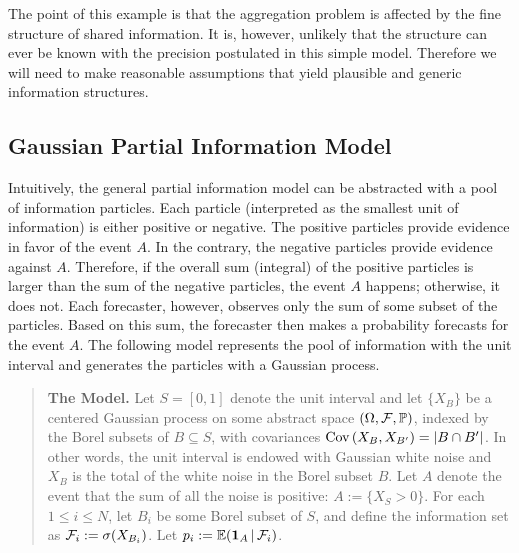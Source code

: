 \documentclass[11pt]{article}
\renewcommand{\P}{\mathbb{P}}
\newcommand{\E}{\mathbb{E}}
\theoremstyle{definition}
\theoremstyle{definition}
\def\one{{\bf 1}}
\def\F{{\cal F}}
\def\P{{\mathbb P}}
\def\E{{\mathbb E}}
\def\Cov{{\rm Cov}\,}
\def\|{\, | \,}
\begin{document}
The point of this example is that the aggregation problem is affected
by the fine structure of shared information.  It is, however, unlikely
that the structure can ever be known with the precision postulated in
this simple model.  Therefore we will need to make reasonable
assumptions that yield plausible and generic information structures.

\subsection{Gaussian Partial Information Model}
\label{ss:Gaussian}
Intuitively, the general partial information model can be abstracted with a pool of information particles. Each particle (interpreted as the smallest unit of information) is either positive or negative. The positive particles provide evidence in favor of the event $A$. 
In the contrary, the negative particles provide evidence against $A$. Therefore, if the overall sum (integral) of the positive particles is larger than the sum of the negative particles, the event $A$ happens; otherwise, it does not. Each forecaster, however, observes only the sum of some subset of the particles. Based on this sum, the forecaster then makes a probability forecasts for the event $A$. The following model represents the pool of information with the unit interval and generates the particles with a Gaussian process. 

\begin{quote}
{\bf The Model.} Let $S = [0,1]$ denote the unit interval and let $\{
X_B \}$ be a centered Gaussian process on some abstract space $(\Omega
, \F , \P)$, indexed by the Borel subsets of $B \subseteq S$, with
covariances $\Cov (X_B , X_{B'}) = |B \cap B'|$.  In other words, the
unit interval is endowed with Gaussian white noise and $X_B$ is the
total of the white noise in the Borel subset $B$.  Let $A$ denote the
event that the sum of all the noise is positive: $A := \{ X_S > 0 \}$.
For each $1 \leq i \leq N$, let $B_i$ be some Borel subset of $S$, and
define the information set as $\F_i := \sigma (X_{B_i})$.  Let $p_i :=
\E (\one_A \| \F_i)$.
\end{quote}
\end{document}
